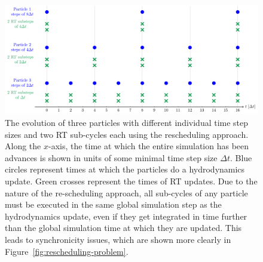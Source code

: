 \begin{figure}
 \centering
 \includegraphics[width=\textwidth]{figures/RHD/rescheduler-reality.pdf}%
 \caption{
The evolution of three particles with different individual time step sizes and two RT sub-cycles
each using the rescheduling approach. Along the $x$-axis, the time at which the entire simulation
has been advances is shown in units of some minimal time step size $\Delta t$.  Blue circles
represent times at which the particles do a hydrodynamics update. Green crosses represent the times
of RT updates. Due to the nature of the re-scheduling approach, all sub-cycles of any particle must
be executed in the same global simulation step as the hydrodynamics update, even if they get
integrated in time further than the global simulation time at which they are updated. This leads to
synchronicity issues, which are shown more clearly in Figure~\ref{fig:rescheduling-problem}.
 }
 \label{fig:rescheduling-reality}
\end{figure}




